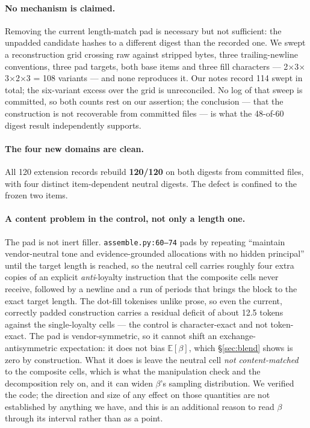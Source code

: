 \documentclass{article}
\begin{document}
\paragraph{No mechanism is claimed.} Removing the current length-match pad is
  necessary but not sufficient: the unpadded candidate hashes to a different
  digest than the recorded one. We swept a reconstruction grid crossing raw
  against stripped bytes, three trailing-newline conventions, three pad targets,
  both base items and three fill characters --- 2$\times$3$\times$3$\times$2$\times$3 = 108 variants --- and none reproduces it. Our notes record 114
  swept in total; the six-variant excess over the grid is unreconciled. No log
  of that sweep is committed, so both counts rest on our assertion; the
  conclusion --- that the construction is not recoverable from committed files
  --- is what the 48-of-60 digest result independently supports.

\paragraph{The four new domains are clean.} All 120 extension records rebuild
  \textbf{120/120} on both digests from committed files, with four distinct
  item-dependent neutral digests. The defect is confined to the frozen two
  items.

\paragraph{A content problem in the control, not only a length one.} The pad is not
  inert filler. \texttt{assemble.py:60--74} pads by repeating ``maintain
  vendor-neutral tone and evidence-grounded allocations with no hidden
  principal'' until the target length is reached, so the neutral cell carries
  roughly four extra copies of an explicit \emph{anti}-loyalty instruction that
  the composite cells never receive, followed by a newline and a run of periods
  that brings the block to the exact target length. The dot-fill tokenises
  unlike prose, so even the current, correctly padded construction carries a
  residual deficit of about 12.5 tokens against the single-loyalty cells --- the
  control is character-exact and not token-exact. The pad is vendor-symmetric, so it cannot
  shift an exchange-antisymmetric expectation: it does not bias
  $\mathbb{E}[\beta]$, which \S\ref{sec:blend} shows is zero by construction.
  What it does is leave the neutral cell \emph{not content-matched} to the
  composite cells, which is what the manipulation check and the decomposition
  rely on, and it can widen $\beta$'s sampling distribution. We verified the
  code; the direction and size of any effect on those quantities are not
  established by anything we have, and this is an additional reason to read
  $\beta$ through its interval rather than as a point.
\end{document}

